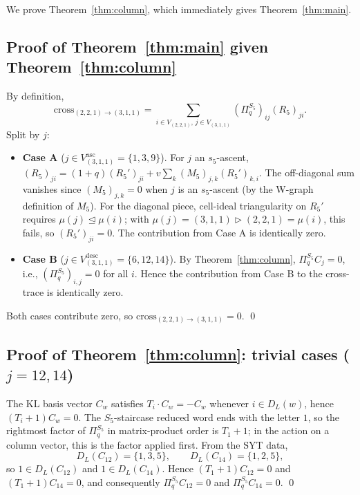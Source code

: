 \documentclass[11pt]{article}
\theoremstyle{definition}
\begin{document}
We prove Theorem~\ref{thm:column}, which immediately gives Theorem~\ref{thm:main}.

\subsection{Proof of Theorem~\ref{thm:main} given Theorem~\ref{thm:column}}

By definition,
\[
\mathrm{cross}_{(2,2,1)\to(3,1,1)} = \sum_{i \in V_{(2,2,1)},\, j \in V_{(3,1,1)}} (\Pi_q^{S_5})_{ij}(R_5)_{ji}.
\]
Split by $j$:
\begin{itemize}[leftmargin=2em,topsep=0.3em,itemsep=0.2em]
\item \textbf{Case A} ($j \in V_{(3,1,1)}^{\text{asc}} = \{1, 3, 9\}$). For $j$ an $s_5$-ascent, $(R_5)_{ji} = (1+q)(R_5')_{ji} + v\sum_k (M_5)_{j,k}(R_5')_{k,i}$. The off-diagonal sum vanishes since $(M_5)_{j,k} = 0$ when $j$ is an $s_5$-ascent (by the W-graph definition of $M_5$). For the diagonal piece, cell-ideal triangularity on $R_5'$ requires $\mu(j) \trianglelefteq \mu(i)$; with $\mu(j) = (3,1,1) \triangleright (2,2,1) = \mu(i)$, this fails, so $(R_5')_{ji} = 0$. The contribution from Case A is identically zero.

\item \textbf{Case B} ($j \in V_{(3,1,1)}^{\text{desc}} = \{6, 12, 14\}$). By Theorem~\ref{thm:column}, $\Pi_q^{S_5} C_j = 0$, i.e., $(\Pi_q^{S_5})_{i,j} = 0$ for all $i$. Hence the contribution from Case B to the cross-trace is identically zero.
\end{itemize}
Both cases contribute zero, so $\mathrm{cross}_{(2,2,1)\to(3,1,1)} = 0$. \qed

\subsection{Proof of Theorem~\ref{thm:column}: trivial cases ($j = 12, 14$)}

The KL basis vector $C_w$ satisfies $T_i \cdot C_w = -C_w$ whenever $i \in D_L(w)$, hence $(T_i+1)C_w = 0$. The $S_5$-staircase reduced word ends with the letter $1$, so the rightmost factor of $\Pi_q^{S_5}$ in matrix-product order is $T_1+1$; in the action on a column vector, this is the factor applied first. From the SYT data,
\[
D_L(C_{12}) = \{1, 3, 5\}, \qquad D_L(C_{14}) = \{1, 2, 5\},
\]
so $1 \in D_L(C_{12})$ and $1 \in D_L(C_{14})$. Hence $(T_1+1)C_{12} = 0$ and $(T_1+1)C_{14} = 0$, and consequently $\Pi_q^{S_5} C_{12} = 0$ and $\Pi_q^{S_5} C_{14} = 0$. \qed
\end{document}
